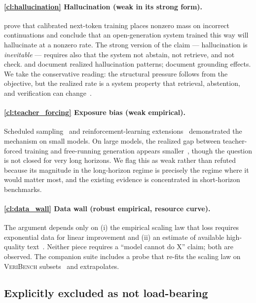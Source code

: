 \paragraph{\ref{cl:hallucination} Hallucination (weak in its strong form).}
\citet{kalai2024calibrated} prove that calibrated next-token training places nonzero mass on incorrect continuations and conclude that an open-generation system trained this way will hallucinate at a nonzero rate.
The strong version of the claim --- hallucination is \emph{inevitable} --- requires also that the system not abstain, not retrieve, and not check.
\citet{kang2023impact} and \citet{maynez2020faithfulness} document realized hallucination patterns;
\citet{liu2024lost} document grounding effects.
We take the conservative reading: the structural pressure follows from the objective, but the realized rate is a system property that retrieval, abstention, and verification can change~\citep{ji2023survey}.

\paragraph{\ref{cl:teacher_forcing} Exposure bias (weak empirical).}
Scheduled sampling~\citep{bengio2015scheduled} and reinforcement-learning extensions~\citep{ranzato2016sequence} demonstrated the mechanism on small models.
On large models, the realized gap between teacher-forced training and free-running generation appears smaller~\citep{wang2020exposure}, though the question is not closed for very long horizons.
We flag this as weak rather than refuted because its magnitude in the long-horizon regime is precisely the regime where it would matter most, and the existing evidence is concentrated in short-horizon benchmarks.

\paragraph{\ref{cl:data_wall} Data wall (robust empirical, resource curve).}
The argument depends only on (i) the empirical scaling law that loss requires exponential data for linear improvement and (ii) an estimate of available high-quality text~\citep{villalobos2024position}.
Neither piece requires a ``model cannot do X'' claim;
both are observed.
The companion suite includes a probe that re-fits the scaling law on \textsc{VeriBench} subsets~\citep{daruru2024veribench} and extrapolates.

\subsection{Explicitly excluded as not load-bearing}
\label{ssec:excluded}

